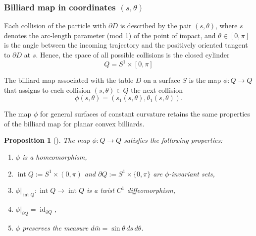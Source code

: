 \documentclass[a4paper,12pt,reqno]{amsart}
\numberwithin{equation}{section}
\newtheorem{proposition}[theorem]{Proposition}
\begin{document}
\subsubsection{Billiard map in coordinates $(s,\theta)$}	
Each collision of the particle with $\partial D$ is described by the pair $(s,\theta)$, where $s$ denotes the arc-length parameter (mod 1) of the point of impact, and $\theta\in[0,\pi]$ is the angle between the incoming trajectory and the positively oriented tangent to $\partial D$ at $s$. 
Hence, the space of all possible collisions is the closed cylinder
\[
Q=S^1 \times [0,\pi]
\] 

The billiard map associated with the table $D$ on a surface $S$ is the map $\phi \colon Q\to Q$ that 
assigns to each collision $(s,\theta) \in Q$ the next collision 
\[
\phi(s,\theta)=(s_1(s,\theta),\theta_1(s,\theta)).
\] 

The map $\phi$ for general surfaces of constant curvature retains the same properties of the billiard map for planar convex billiards.

\begin{proposition}[\cite{DiasCarneiro:2024}] \label{prop:properties}
The map $\phi \colon Q \to Q$ satisfies the following properties:
\begin{enumerate} 
\item $\phi$ is a homeomorphism, 
\item $\operatorname{int} Q := S^1 \times (0,\pi)$ and $\partial Q:= S^1 \times \{0,\pi\}$ are $\phi$-invariant sets, 
\item $\phi|_{\operatorname{int} Q} \colon \operatorname{int} Q \to \operatorname{int} Q$ is a twist $C^1$ diffeomorphism,
\item $\phi|_{\partial Q} = \operatorname{id}_{\partial Q}$,
\item $\phi$ preserves the measure $d \bar{m} = \sin \theta \,ds \, d\theta$. 
\end{enumerate}
\end{proposition}
\end{document}
